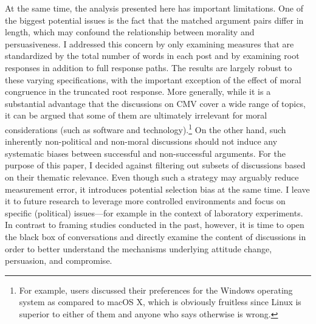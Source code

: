 At the same time, the analysis presented here has important limitations. One of the biggest potential issues is the fact that the matched argument pairs differ in length, which may confound the relationship between morality and persuasiveness. I addressed this concern by only examining measures that are standardized by the total number of words in each post and by examining root responses in addition to full response paths. The results are largely robust to these varying specifications, with the important exception of the effect of moral congruence in the truncated root response. More generally, while it is a substantial advantage that the discussions on CMV cover a wide range of topics, it can be argued that some of them are ultimately irrelevant for moral considerations (such as software and technology).\footnote{For example, users discussed their preferences for the Windows operating system as compared to macOS X, which is obviously fruitless since Linux is superior to either of them and anyone who says otherwise is wrong.} On the other hand, such inherently non-political and non-moral discussions should not induce any systematic biases between successful and non-successful arguments. For the purpose of this paper, I decided against filtering out subsets of discussions based on their thematic relevance. Even though such a strategy may arguably reduce measurement error, it introduces potential selection bias at the same time. I leave it to future research to leverage more controlled environments and focus on specific (political) issues---for example in the context of laboratory experiments. In contrast to framing studies conducted in the past, however, it is time to open the black box of conversations and directly examine the content of discussions in order to better understand the mechanisms underlying attitude change, persuasion, and compromise.




